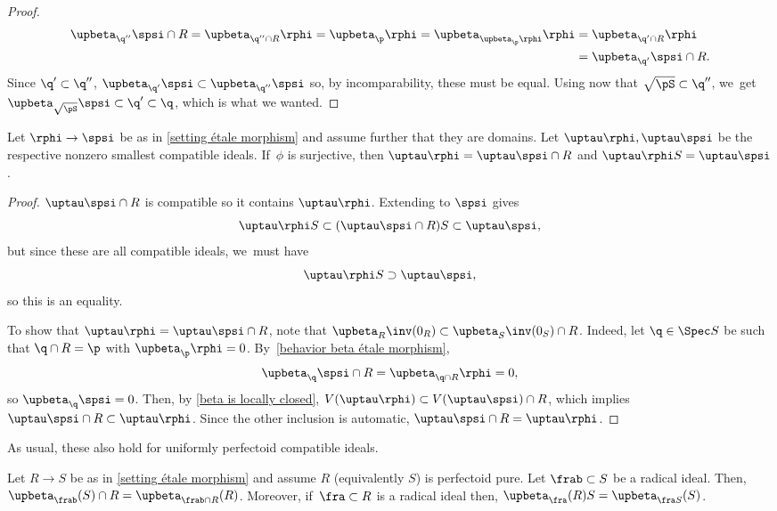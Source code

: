\begin{proof}
\begin{align*}
\upbeta_{\q''}\spsi\cap R=\upbeta_{\q''\cap R}\rphi=\upbeta_\p\rphi=\upbeta_{\upbeta_\p\rphi}\rphi&=\upbeta_{\q'\cap R}\rphi\\
&=\upbeta_{\q'}\spsi\cap R.
\end{align*}
Since $\q'\subset \q''$, $\upbeta_{\q'}\spsi\subset\upbeta_{\q''}\spsi$ so, by incomparability, these must be equal.
Using now that $\sqrt{\pS}\subset \q''$, we~get $\upbeta_{\sqrt{\pS}}\spsi\subset \q'\subset \q$, which is what we wanted.
\end{proof}

\begin{corollary}\label{test ideal of pairs under étale morphisms}
Let $\rphi\to\spsi$ be as in \autoref{setting étale morphism} and assume further that they are domains. Let $\uptau\rphi, \uptau\spsi$ be the respective nonzero smallest compatible ideals. If~$\phi$ is surjective, then $\uptau\rphi=\uptau\spsi\cap R$ and $\uptau\rphi S=\uptau\spsi$.
\end{corollary}

\begin{proof}
$\uptau\spsi\cap R$ is compatible so it contains $\uptau\rphi$. Extending to $\spsi$ gives
\[
\uptau\rphi S\subset (\uptau\spsi\cap R) S \subset \uptau\spsi,
\]
but since these are all compatible ideals, we~must have
\[
\uptau\rphi S\supset \uptau\spsi,
\]
so this is an equality.

To show that $\uptau\rphi=\uptau\spsi\cap R$, note that $\upbeta_R\inv(0_R)\subset \upbeta_S\inv(0_S)\cap R$. Indeed, let $\q\in \Spec S$ be such that $\q\cap R= \p $ with $\upbeta_\p\rphi=0$. By~\autoref{behavior beta étale morphism},\vspace*{-3pt}
\[
\upbeta_\q\spsi\cap R=\upbeta_{\q\cap R}\rphi=0,
\]
so $\upbeta_\q\spsi=0$.
Then, by \autoref{beta is locally closed}, $V(\uptau\rphi)\subset V(\uptau\spsi)\cap R$, which implies $\uptau\spsi\cap R \subset \uptau\rphi$. Since the other inclusion is automatic, $\uptau\spsi\cap R = \uptau\rphi$.
\end{proof}

As usual, these also hold for uniformly perfectoid compatible ideals.
\begin{proposition}
Let $R\to S$ be as in \autoref{setting étale morphism} and assume $R$ (equivalently $S$) is perfectoid pure. Let $\frab\subset S$ be a radical ideal. Then, $\upbeta_\frab(S)\cap R=\upbeta_{\frab\cap R}(R)$. Moreover, if~$\fra\subset R$ is a radical ideal then, $\upbeta_\fra(R)S=\upbeta_{\fra S}(S)$.
\end{proposition}


